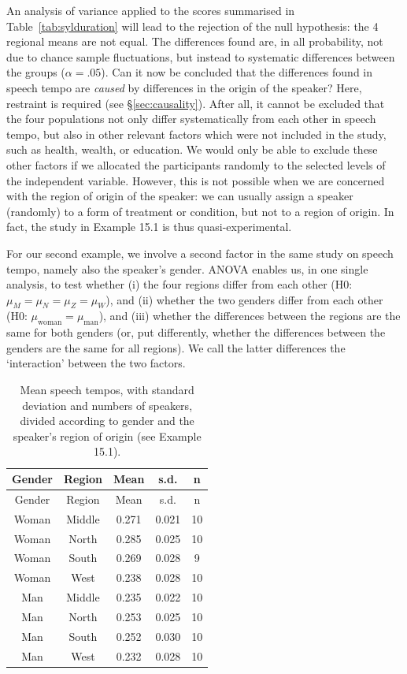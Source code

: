 \documentclass[
]{book}
\begin{document}
An analysis of variance applied to the scores summarised in
Table~\ref{tab:sylduration}
will lead to the rejection of the null hypothesis: the 4 regional
means are not equal. The differences found are, in all probability, not due to
chance sample fluctuations, but instead to systematic differences between
the groups (\(\alpha=.05\)). Can it now be concluded that the differences
found in speech tempo are \emph{caused} by differences in the origin of the
speaker? Here, restraint is required (see
§\ref{sec:causality}). After all, it cannot be excluded that
the four populations not only differ systematically from each other in speech
tempo, but also in other relevant factors which were not included in the study,
such as health, wealth, or education. We would only be able to exclude these other
factors if we allocated the participants randomly to the selected levels of the
independent variable. However, this is not possible when we are concerned with the
region of origin of the speaker: we can usually assign a speaker (randomly)
to a form of treatment or condition, but not to a region of origin. In fact,
the study in Example 15.1 is thus quasi-experimental.

For our second example, we involve a second factor in the same study
on speech tempo, namely also the speaker's gender.
ANOVA enables us, in one single analysis, to test whether (i) the four
regions differ from each other (H0: \(\mu_M = \mu_N = \mu_Z = \mu_W\)), and
(ii) whether the two genders differ from each other (H0:
\(\mu_\textrm{woman} = \mu_\textrm{man}\)), and (iii) whether the differences
between the regions are the same for both genders (or, put differently, whether
the differences between the genders are the same for all
regions). We call the latter differences the `interaction' between the two factors.

\begin{longtable}[]{@{}ccccc@{}}
\caption{\label{tab:sylduration2way} Mean speech tempos, with standard deviation and
numbers of speakers, divided according to gender and the speaker's region of origin
(see Example 15.1).}\tabularnewline
\toprule
Gender & Region & Mean & s.d. & n\tabularnewline
\midrule
\endfirsthead
\toprule
Gender & Region & Mean & s.d. & n\tabularnewline
\midrule
\endhead
Woman & Middle & 0.271 & 0.021 & 10\tabularnewline
Woman & North & 0.285 & 0.025 & 10\tabularnewline
Woman & South & 0.269 & 0.028 & 9\tabularnewline
Woman & West & 0.238 & 0.028 & 10\tabularnewline
Man & Middle & 0.235 & 0.022 & 10\tabularnewline
Man & North & 0.253 & 0.025 & 10\tabularnewline
Man & South & 0.252 & 0.030 & 10\tabularnewline
Man & West & 0.232 & 0.028 & 10\tabularnewline
\bottomrule
\end{longtable}
\end{document}

